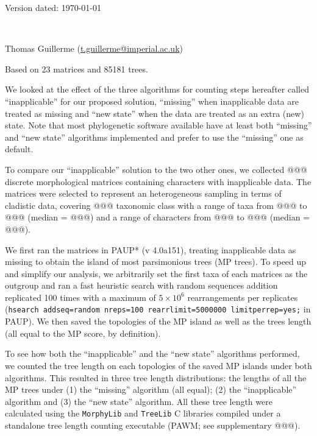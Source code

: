 \documentclass[a4paper,11pt]{article}
\begin{document}
\begin{flushright}
Version dated: \today
\end{flushright}
\begin{center}

\\
\bigskip

Thomas Guillerme (\href{mailto:t.guillerme@imperial.ac.uk}{t.guillerme@imperial.ac.uk})

\end{center}

Based on 23 matrices and 85181 trees.

We looked at the effect of the three algorithms for counting steps hereafter called ``inapplicable'' for our proposed solution, ``missing'' when  inapplicable data are treated as missing and ``new state'' when the data are treated as an extra (new) state.
Note that most phylogenetic software available have at least both ``missing'' and ``new state'' algorithms implemented and prefer to use the ``missing'' one as default.

To compare our ``inapplicable'' solution to the two other ones, we collected @@@ discrete morphological matrices containing characters with inapplicable data.
The matrices were selected to represent an heterogeneous sampling in terms of cladistic data, covering @@@ taxonomic class with a range of taxa from @@@ to @@@ (median = @@@) and a range of characters from @@@ to @@@ (median = @@@).

We first ran the matrices in PAUP* (v 4.0a151), treating inapplicable data as missing to obtain the island of most parsimonious trees (MP trees).
To speed up and simplify our analysis, we arbitrarily set the first taxa of each matrices as the outgroup and ran a fast heuristic search with random sequences addition replicated 100 times with a maximum of $5 \times 10^6$ rearrangements per replicates (\texttt{hsearch addseq=random nreps=100 rearrlimit=5000000 limitperrep=yes;} in PAUP).
We then saved the topologies of the MP island as well as the trees length (all equal to the MP score, by definition).

To see how both the ``inapplicable'' and the ``new state'' algorithms performed, we counted the tree length on each topologies of the saved MP islands under both algorithms.
This resulted in three tree length distributions: the lengths of all the MP trees under (1) the ``missing'' algorithm (all equal); (2) the ``inapplicable'' algorithm and (3) the ``new state'' algorithm.
All these tree length were calculated using the \texttt{MorphyLib} and \texttt{TreeLib} C libraries compiled under a standalone tree length counting executable (PAWM; see supplementary @@@).
\end{document}
